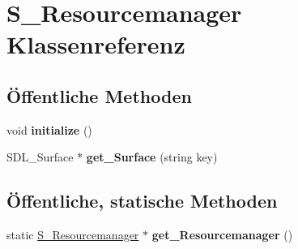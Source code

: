 \hypertarget{class_s___resourcemanager}{\section{S\-\_\-\-Resourcemanager Klassenreferenz}
\label{class_s___resourcemanager}
}
\subsection*{Öffentliche Methoden}
\begin{DoxyCompactItemize}
\item 
\hypertarget{class_s___resourcemanager_aa20eaf4ccdd3188ddf5d393b6a975efd}{void {\bfseries initialize} ()}\label{class_s___resourcemanager_aa20eaf4ccdd3188ddf5d393b6a975efd}

\item 
\hypertarget{class_s___resourcemanager_a0b3ad58e4b25c14849f03dfc949045cf}{S\-D\-L\-\_\-\-Surface $\ast$ {\bfseries get\-\_\-\-Surface} (string key)}\label{class_s___resourcemanager_a0b3ad58e4b25c14849f03dfc949045cf}

\end{DoxyCompactItemize}
\subsection*{Öffentliche, statische Methoden}
\begin{DoxyCompactItemize}
\item 
\hypertarget{class_s___resourcemanager_a785fd4b8631a35647823bd41c28ae2d0}{static \hyperlink{class_s___resourcemanager}{S\-\_\-\-Resourcemanager} $\ast$ {\bfseries get\-\_\-\-Resourcemanager} ()}\label{class_s___resourcemanager_a785fd4b8631a35647823bd41c28ae2d0}

\end{DoxyCompactItemize}
